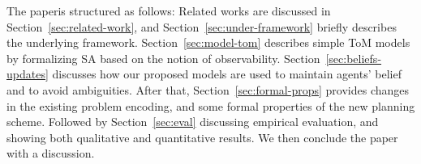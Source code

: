 \documentclass[letterpaper]{article} %
\begin{document}




The paper\footnotemark is structured as follows: 
Related works are discussed in Section~\ref{sec:related-work}, and Section~\ref{sec:under-framework} briefly describes the underlying framework. 
Section~\ref{sec:model-tom} describes simple ToM models by formalizing SA based on the notion of observability. 
Section~\ref{sec:beliefs-updates} discusses how our proposed models are used to maintain agents' belief and to avoid ambiguities. 
After that, Section~\ref{sec:formal-props} provides changes in the existing problem encoding, and some formal properties of the new planning scheme. 
Followed by Section~\ref{sec:eval} discussing empirical evaluation, and showing both qualitative and quantitative results. 
We then conclude the paper with a discussion.  


\end{document}
